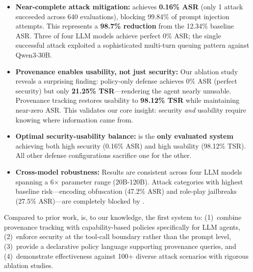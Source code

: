 \begin{itemize}[leftmargin=1.2em]
  \item \textbf{Near-complete attack mitigation:} \sys{} achieves \textbf{0.16\% ASR} (only 1 attack succeeded across 640 evaluations), blocking 99.84\% of prompt injection attempts. This represents a \textbf{98.7\% reduction} from the 12.34\% baseline ASR. Three of four LLM models achieve perfect 0\% ASR; the single successful attack exploited a sophisticated multi-turn queuing pattern against Qwen3-30B.
  
  \item \textbf{Provenance enables usability, not just security:} Our ablation study reveals a surprising finding: policy-only defense achieves 0\% ASR (perfect security) but only \textbf{21.25\% TSR}---rendering the agent nearly unusable. Provenance tracking restores usability to \textbf{98.12\% TSR} while maintaining near-zero ASR. This validates our core insight: security \emph{and} usability require knowing where information came from.
  
  \item \textbf{Optimal security-usability balance:} \sys{} is the \textbf{only evaluated system} achieving both high security (0.16\% ASR) and high usability (98.12\% TSR). All other defense configurations sacrifice one for the other.
  
  \item \textbf{Cross-model robustness:} Results are consistent across four LLM models spanning a 6$\times$ parameter range (20B-120B). Attack categories with highest baseline risk---encoding obfuscation (47.2\% ASR) and role-play jailbreaks (27.5\% ASR)---are completely blocked by \sys{}.
\end{itemize}

Compared to prior work, \sys{} is, to our knowledge, the first system to:
(1)~combine provenance tracking with capability-based policies specifically for LLM agents,
(2)~enforce security at the tool-call boundary rather than the prompt level,
(3)~provide a declarative policy language supporting provenance queries, and
(4)~demonstrate effectiveness against 100+ diverse attack scenarios with rigorous ablation studies.


